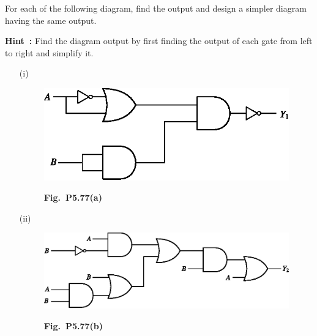 \eject

\begin{problem}\label{prob5.77}
For each of the following diagram, find the output and design a simpler diagram having the same output.

\smallskip
\noindent
{\bf Hint~:} Find the diagram output by first finding the output of each gate from left to right and simplify it.
\begin{itemize}
\item[(i)]~
\begin{figure}[H]
\centering
\includegraphics{chap5/figP3a.eps}
\smallskip

{\bf Fig.~P5.77(a)}
\end{figure}

\item[(ii)]~
\begin{figure}[H]
\centering
\includegraphics{chap5/figP3b.eps}
\smallskip

{\bf Fig.~P5.77(b)}
\end{figure}
\end{itemize}
\end{problem}

